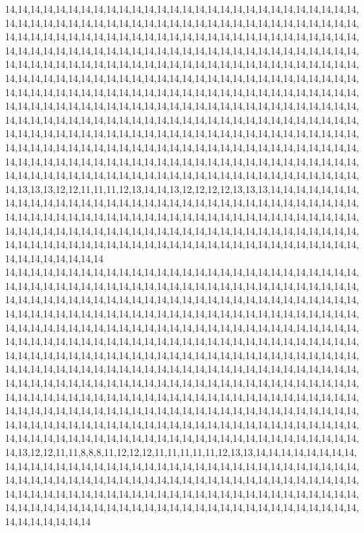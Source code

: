 14,14,14,14,14,14,14,14,14,14,14,14,14,14,14,14,14,14,14,14,14,14,14,14,14,14,14,14,14,14,14,14,14,14,14,14,14,14,14,14,14,14,14,14,14,14,14,14,14,14,14,14,14,14,14,14,14,14,14,14,14,14,14,14,14,14,14,14,14,14,14,14,14,14,14,14,14,14,14,14,14,14,14,14,14,14,14,14,14,14,14,14,14,14,14,14,14,14,14,14,14,14,14,14,14,14,14,14,14,14,14,14,14,14,14,14,14,14,14,14,14,14,14,14,14,14,14,14,14,14,14,14,14,14,14,14,14,14,14,14,14,14,14,14,14,14,14,14,14,14,14,14,14,14,14,14,14,14,14,14,14,14,14,14,14,14,14,14,14,14,14,14,14,14,14,14,14,14,14,14,14,14,14,14,14,14,14,14,14,14,14,14,14,14,14,14,14,14,14,14,14,14,14,14,14,14,14,14,14,14,14,14,14,14,14,14,14,14,14,14,14,14,14,14,14,14,14,14,14,14,14,14,14,14,14,14,14,14,14,14,14,14,14,14,14,14,14,14,14,14,14,14,14,14,14,14,14,14,14,14,14,14,14,14,14,14,14,14,14,14,14,14,14,14,14,14,14,14,14,14,14,14,14,14,14,14,14,14,14,14,14,14,14,14,14,14,14,14,14,14,14,14,14,14,14,14,14,14,14,14,14,14,14,14,14,14,14,14,14,14,14,14,14,14,14,14,14,14,14,14,14,14,14,14,14,14,14,14,14,14,14,14,14,14,14,14,14,14,14,14,14,14,14,14,14,14,14,14,14,14,14,14,14,14,14,13,13,13,12,12,11,11,11,12,13,14,14,13,12,12,12,12,13,13,13,14,14,14,14,14,14,14,14,14,14,14,14,14,14,14,14,14,14,14,14,14,14,14,14,14,14,14,14,14,14,14,14,14,14,14,14,14,14,14,14,14,14,14,14,14,14,14,14,14,14,14,14,14,14,14,14,14,14,14,14,14,14,14,14,14,14,14,14,14,14,14,14,14,14,14,14,14,14,14,14,14,14,14,14,14,14,14,14,14,14,14,14,14,14,14,14,14,14,14,14,14,14,14,14,14,14,14,14,14,14,14,14,14,14,14,14,14,14,14,14,14,14,14,14,14,14,14
14,14,14,14,14,14,14,14,14,14,14,14,14,14,14,14,14,14,14,14,14,14,14,14,14,14,14,14,14,14,14,14,14,14,14,14,14,14,14,14,14,14,14,14,14,14,14,14,14,14,14,14,14,14,14,14,14,14,14,14,14,14,14,14,14,14,14,14,14,14,14,14,14,14,14,14,14,14,14,14,14,14,14,14,14,14,14,14,14,14,14,14,14,14,14,14,14,14,14,14,14,14,14,14,14,14,14,14,14,14,14,14,14,14,14,14,14,14,14,14,14,14,14,14,14,14,14,14,14,14,14,14,14,14,14,14,14,14,14,14,14,14,14,14,14,14,14,14,14,14,14,14,14,14,14,14,14,14,14,14,14,14,14,14,14,14,14,14,14,14,14,14,14,14,14,14,14,14,14,14,14,14,14,14,14,14,14,14,14,14,14,14,14,14,14,14,14,14,14,14,14,14,14,14,14,14,14,14,14,14,14,14,14,14,14,14,14,14,14,14,14,14,14,14,14,14,14,14,14,14,14,14,14,14,14,14,14,14,14,14,14,14,14,14,14,14,14,14,14,14,14,14,14,14,14,14,14,14,14,14,14,14,14,14,14,14,14,14,14,14,14,14,14,14,14,14,14,14,14,14,14,14,14,14,14,14,14,14,14,14,14,14,14,14,14,14,14,14,14,14,14,14,14,14,14,14,14,14,14,14,14,14,14,14,14,14,14,14,14,14,14,14,14,14,14,14,14,14,14,14,14,14,14,14,14,14,14,14,14,14,14,14,14,14,14,14,14,14,14,14,14,14,14,14,14,14,14,14,14,14,14,14,14,14,14,13,12,12,11,11,8,8,8,11,12,12,12,11,11,11,11,11,12,13,13,14,14,14,14,14,14,14,14,14,14,14,14,14,14,14,14,14,14,14,14,14,14,14,14,14,14,14,14,14,14,14,14,14,14,14,14,14,14,14,14,14,14,14,14,14,14,14,14,14,14,14,14,14,14,14,14,14,14,14,14,14,14,14,14,14,14,14,14,14,14,14,14,14,14,14,14,14,14,14,14,14,14,14,14,14,14,14,14,14,14,14,14,14,14,14,14,14,14,14,14,14,14,14,14,14,14,14,14,14,14,14,14,14,14,14,14,14,14,14,14,14,14,14,14,14,14,14
